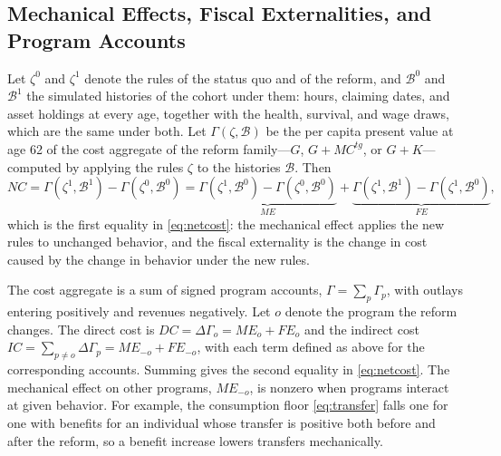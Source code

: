\subsection{Mechanical Effects, Fiscal Externalities, and Program Accounts}

Let $\zeta^{0}$ and $\zeta^{1}$ denote the rules of the status quo and of the reform, and $\mathcal{B}^{0}$ and $\mathcal{B}^{1}$ the simulated histories of the cohort under them: hours, claiming dates, and asset holdings at every age, together with the health, survival, and wage draws, which are the same under both. Let $\Gamma(\zeta,\mathcal{B})$ be the per capita present value at age 62 of the cost aggregate of the reform family---$G$, $G+\mathit{MC}^{tg}$, or $G+K$---computed by applying the rules $\zeta$ to the histories $\mathcal{B}$. Then
\begin{equation*}
\mathit{NC}=\Gamma(\zeta^{1},\mathcal{B}^{1})-\Gamma(\zeta^{0},\mathcal{B}^{0})
=\underbrace{\Gamma(\zeta^{1},\mathcal{B}^{0})-\Gamma(\zeta^{0},\mathcal{B}^{0})}_{\mathit{ME}}
+\underbrace{\Gamma(\zeta^{1},\mathcal{B}^{1})-\Gamma(\zeta^{1},\mathcal{B}^{0})}_{\mathit{FE}},
\end{equation*}
which is the first equality in \eqref{eq:netcost}: the mechanical effect applies the new rules to unchanged behavior, and the fiscal externality is the change in cost caused by the change in behavior under the new rules.

The cost aggregate is a sum of signed program accounts, $\Gamma=\sum_{p}\Gamma_{p}$, with outlays entering positively and revenues negatively. Let $o$ denote the program the reform changes. The direct cost is $\mathit{DC}=\Delta\Gamma_{o}=\mathit{ME}_{o}+\mathit{FE}_{o}$ and the indirect cost $\mathit{IC}=\sum_{p\neq o}\Delta\Gamma_{p}=\mathit{ME}_{-o}+\mathit{FE}_{-o}$, with each term defined as above for the corresponding accounts. Summing gives the second equality in \eqref{eq:netcost}. The mechanical effect on other programs, $\mathit{ME}_{-o}$, is nonzero when programs interact at given behavior. For example, the consumption floor \eqref{eq:transfer} falls one for one with benefits for an individual whose transfer is positive both before and after the reform, so a benefit increase lowers transfers mechanically.

